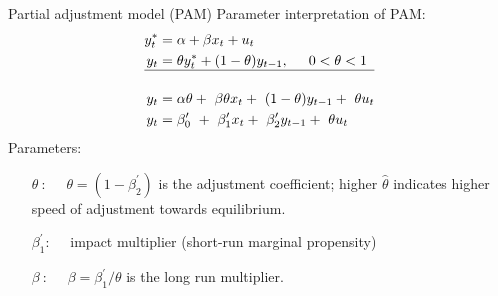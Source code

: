 \documentclass{beamer}
\begin{document}
\begin{frame}{Partial adjustment model (PAM)}
Parameter interpretation of PAM:
\begin{equation*}
\begin{aligned}
{y}_t^\ast &= \alpha + \beta x_t + u_t \\
y_t &= \theta {y}_t^\ast + (1-\theta)y_{t-1}, \hspace{0.5cm} 0 < \theta < 1 \\
\hline \\
y_t &= \alpha \theta +~ \beta \theta x_t +~ (1-\theta) y_{t-1} +~ \theta u_t \\
y_t &= \beta_0^{\prime} ~+~ \beta_1^{\prime} x_t +~ \beta_2^{\prime} y_{t-1} +~ \theta u_t
\end{aligned}
\end{equation*}
\medskip
Parameters:\\
\smallskip
\begin{itemize}
\item[$\theta~:\quad$] $\theta= (1-\beta_2^{\prime})$ is the adjustment coefficient; higher $\hat{\theta}$ indicates higher speed of adjustment towards equilibrium.\\
\smallskip
\item[$\beta_1^{\prime}:\quad$] impact multiplier (short-run marginal propensity)\\
\smallskip
\item [$\beta~:\quad$] $\beta =\beta_1^{\prime}/\theta$ is the long run multiplier.
\end{itemize}
\end{frame}
\end{document}
